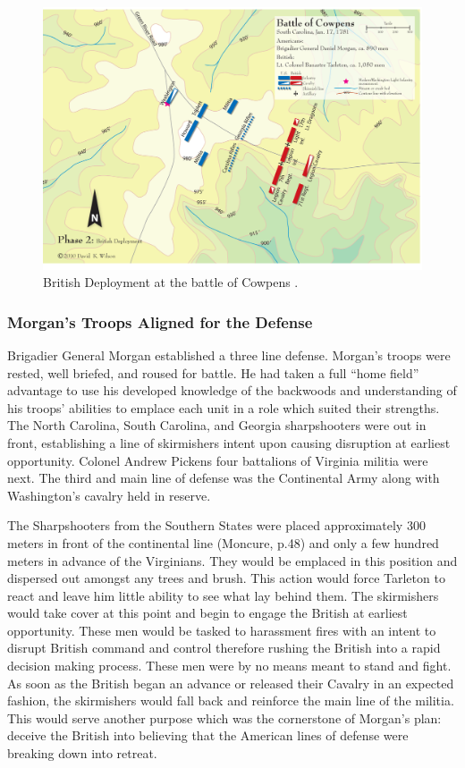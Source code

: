 \begin{figure}[h]
    \begin{center}
    \includegraphics[width=\textwidth]{gfx/beiber02}
    \end{center}
    \caption{British Deployment at the battle of Cowpens \cite{wilson_blogmap}.}
    \label{terrain1}
\end{figure}


\subsubsection{Morgan's Troops Aligned for the Defense}

Brigadier General Morgan established a three line defense. Morgan's
troops were rested, well briefed, and roused for battle.  He had taken a full
“home field” advantage to use his developed knowledge of the backwoods and
understanding of his troops' abilities to emplace each unit in a role which
suited their strengths.  The North Carolina, South Carolina, and Georgia
sharpshooters were out in front, establishing a line of skirmishers intent upon
causing disruption at earliest opportunity.   Colonel Andrew Pickens four
battalions of Virginia militia were next.  The third and main line of defense
was the Continental Army along with Washington's cavalry held in reserve.

The Sharpshooters from the Southern States were placed approximately 300 meters
in front of the continental line (Moncure, p.48) and only a few hundred meters
in advance of the Virginians.  They would be emplaced in this position and
dispersed out amongst any trees and brush.   This action would force Tarleton to
react and leave him little ability to see what lay behind them.  The skirmishers
would take cover at this point and begin to engage the British at earliest
opportunity.  These men would be tasked to harassment fires with an intent to
disrupt British command and control therefore rushing the British into a rapid
decision making process.  These men were by no means meant to stand and fight.
As soon as the British began an advance or released their Cavalry in an expected
fashion, the skirmishers would fall back and reinforce the main line of the
militia.  This would serve another purpose which was the cornerstone of Morgan's
plan: deceive the British into believing that the American lines of defense were
breaking down into retreat.

